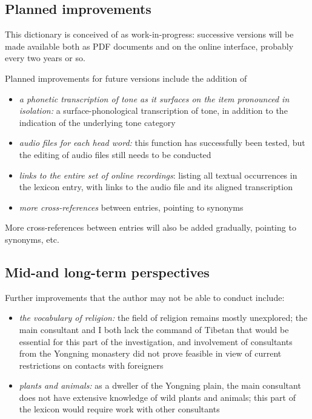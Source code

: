 	\subsection{Planned improvements} \label{sec:improv}
	
This dictionary is conceived of as work-in-progress: successive versions will be made available both as PDF documents and on the online interface, probably every two years or so. 

Planned improvements for future versions include the addition of
\begin{itemize}
	\item \textit{a phonetic transcription of tone as it surfaces on the item pronounced in isolation:} a surface-phonological transcription of tone, in addition to the indication of the underlying tone category
	\item \textit{audio files for each head word:} this function has successfully been tested, but the editing of audio files still needs to be conducted
	\item \textit{links to the entire set of online recordings}: listing all textual occurrences in the lexicon entry, with links to the audio file and its aligned transcription
	\item \textit{more cross-references} between entries, pointing to synonyms
\end{itemize}

More cross-references between entries will also be added gradually, pointing to synonyms, etc.

	\subsection{Mid-and long-term perspectives} \label{sec:long}

Further improvements that the author may not be able to conduct include:
\begin{itemize}
	\item \textit{the vocabulary of religion:} the field of religion remains mostly unexplored; the main consultant and I both lack the command of Tibetan that would be essential for this part of the investigation, and involvement of consultants from the Yongning monastery did not prove feasible in view of current restrictions on contacts with foreigners
	\item \textit{plants and animals:} as a dweller of the Yongning plain, the main consultant does not have extensive knowledge of wild plants and animals; this part of the lexicon would require work with other consultants
\end{itemize}

